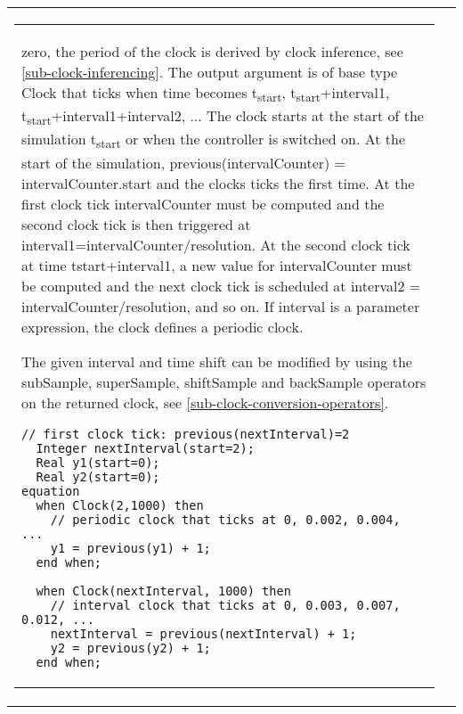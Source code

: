 \begin{longtable}[]{|p{3cm}|p{12cm}|}
\begin{tabular}{@{}p{119mm}@{}}
zero, the period of the clock is derived by clock inference, see
\cref{sub-clock-inferencing}. The output argument is of base type Clock that ticks when time
becomes t\textsubscript{start}, t\textsubscript{start}+interval1,
t\textsubscript{start}+interval1+interval2, ... The clock starts at the
start of the simulation t\textsubscript{start} or when the controller is
switched on. At the start of the simulation, previous(intervalCounter) =
intervalCounter.start and the clocks ticks the first time. At the first
clock tick intervalCounter must be computed and the second clock tick is
then triggered at interval1=intervalCounter/resolution. At the second
clock tick at time tstart+interval1, a new value for intervalCounter
must be computed and the next clock tick is scheduled at interval2 =
intervalCounter/resolution, and so on. If interval is a parameter
expression, the clock defines a periodic clock.

\begin{nonnormative}
The given interval and time shift can be modified by using the subSample, superSample, shiftSample and backSample operators on the returned clock, see \cref{sub-clock-conversion-operators}.
\end{nonnormative}

\begin{example}
\begin{lstlisting}[language=modelica]
  // first clock tick: previous(nextInterval)=2
  Integer nextInterval(start=2);
  Real y1(start=0);
  Real y2(start=0);
equation
  when Clock(2,1000) then
    // periodic clock that ticks at 0, 0.002, 0.004, ...
    y1 = previous(y1) + 1;
  end when;

  when Clock(nextInterval, 1000) then
    // interval clock that ticks at 0, 0.003, 0.007, 0.012, ...
    nextInterval = previous(nextInterval) + 1;
    y2 = previous(y2) + 1;
  end when;
\end{lstlisting}
\end{example}


\end{tabular}
\end{longtable}
